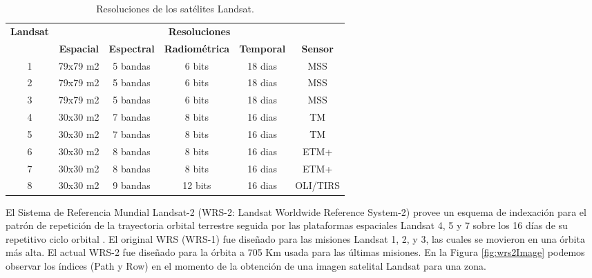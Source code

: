 \begin{table}[htb!]
	\centering
	\begin{tabular}{|c|c|c|c|c|c|}
		\hline
		\multirow{2}{*}{\textbf{Landsat}} & \multicolumn{5}{c|}{\textbf{Resoluciones}}                                                             \\ \cline{2-6} 
		& \textbf{Espacial} & \textbf{Espectral} & \textbf{Radiom\'etrica} & \textbf{Temporal} & \textbf{Sensor} \\ \hline
		1                                 & 79x79 m2          & 5 bandas           & 6 bits                  & 18 dias           & MSS             \\ \hline
		2                                 & 79x79 m2          & 5 bandas           & 6 bits                  & 18 dias           & MSS             \\ \hline
		3                                 & 79x79 m2          & 5 bandas           & 6 bits                  & 18 dias           & MSS             \\ \hline
		4                                 & 30x30 m2          & 7 bandas           & 8 bits                  & 16 dias           & TM              \\ \hline
		5                                 & 30x30 m2          & 7 bandas           & 8 bits                  & 16 dias           & TM              \\ \hline
		6                                 & 30x30 m2          & 8 bandas           & 8 bits                  & 16 dias           & ETM+            \\ \hline
		7                                 & 30x30 m2          & 8 bandas           & 8 bits                  & 16 dias           & ETM+            \\ \hline
		8                                 & 30x30 m2          & 9 bandas           & 12 bits                 & 16 dias           & OLI/TIRS        \\ \hline
	\end{tabular}
	\caption{Resoluciones de los sat\'elites Landsat.}
		\label{t:landsattipos}
\end{table}
El Sistema de Referencia Mundial Landsat-2 (WRS-2: Landsat Worldwide Reference System-2) provee un esquema de indexaci\'on para el patr\'on de repetici\'on de la trayectoria orbital terrestre seguida por las plataformas espaciales Landsat 4, 5 y 7 sobre los 16 d\'ias de su repetitivo ciclo orbital \cite{els2015refere}. El original WRS (WRS-1) fue dise\~{n}ado para las misiones Landsat 1, 2, y 3, las cuales se movieron en una \'orbita m\'as alta. El actual WRS-2 fue dise\~{n}ado para la \'orbita a 705 Km usada para las \'ultimas misiones. En la Figura \ref{fig:wrs2Image} podemos observar los \'indices (Path y Row) en el momento de la obtenci\'on de una imagen satelital Landsat para una zona.


